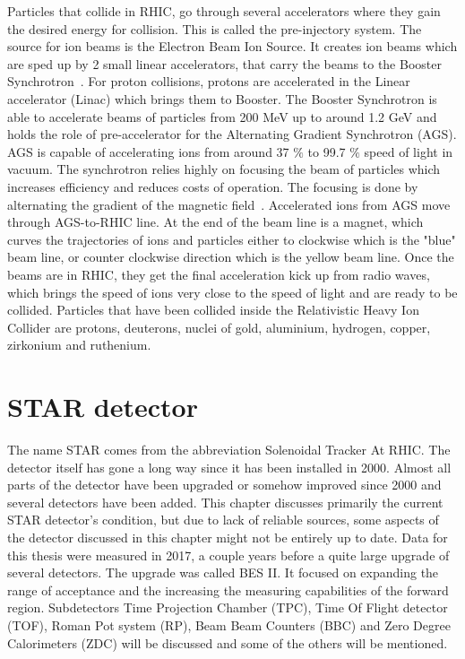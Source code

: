 Particles that collide in RHIC, go through several accelerators where they gain the desired energy for collision. This is called the pre-injectory system. The source for ion beams is the Electron Beam Ion Source. It creates ion beams which are sped up by 2 small linear accelerators, that carry the beams to the Booster Synchrotron~\cite{RHIC}. For proton collisions, protons are accelerated in the Linear accelerator (Linac) which brings them to Booster. The Booster Synchrotron is able to accelerate beams of particles from 200 MeV up to around 1.2 GeV and holds the role of pre-accelerator for the Alternating Gradient Synchrotron (AGS). AGS is capable of accelerating ions from around 37 $\%$ to 99.7 $\%$ speed of light in vacuum. The synchrotron relies highly on focusing the beam of particles which increases efficiency and reduces costs of operation. The focusing is done by alternating the gradient of the magnetic field~\cite{Adams}. Accelerated ions from AGS move through AGS-to-RHIC line. At the end of the beam line is a magnet, which curves the trajectories of ions and particles either to clockwise which is the "blue" beam line, or counter clockwise direction which is the yellow beam line. Once the beams are in RHIC, they get the final acceleration kick up from radio waves, which brings the speed of ions very close to the speed of light and are ready to be collided. Particles that have been collided inside the Relativistic Heavy Ion Collider are protons, deuterons, nuclei of gold, aluminium, hydrogen, copper, zirkonium and ruthenium. 

\section{STAR detector}
\label{STAR}
The name STAR comes from the abbreviation Solenoidal Tracker At RHIC. The detector itself has gone a long way since it has been installed in 2000. Almost all parts of the detector have been upgraded or somehow improved since 2000 and several detectors have been added. This chapter discusses primarily the current STAR detector's condition, but due to lack of reliable sources, some aspects of the detector discussed in this chapter  might not be entirely up to date. 
\newline
Data for this thesis were measured in 2017, a couple years before a quite large upgrade of several detectors. The upgrade was called BES II\cite{BESII}. It focused on expanding the range of acceptance and the increasing the measuring capabilities of the forward region. Subdetectors Time Projection Chamber (TPC), Time Of Flight detector (TOF), Roman Pot system (RP), Beam Beam Counters (BBC) and Zero Degree Calorimeters (ZDC) will be discussed and some of the others will be mentioned.

